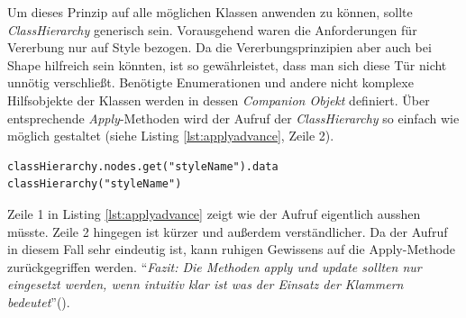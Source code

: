 Um dieses Prinzip auf alle möglichen Klassen anwenden zu können, sollte \textit{ClassHierarchy} generisch sein. Vorausgehend waren die Anforderungen für Vererbung nur auf Style bezogen. Da die Vererbungsprinzipien aber auch bei Shape hilfreich sein könnten, ist so gewährleistet, dass man sich diese Tür nicht unnötig verschließt. 
Benötigte Enumerationen und andere nicht komplexe Hilfsobjekte der Klassen werden in dessen \textit{Companion Objekt} definiert. 
Über entsprechende \textit{Apply}-Methoden wird der Aufruf der \textit{ClassHierarchy} so einfach wie möglich gestaltet (siehe Listing \ref{lst:applyadvance}, Zeile 2).
\begin{lstlisting}[style=scala, caption = {Beispielhafte Vereinfachung durch Apply Methode}, label = {lst:applyadvance}]
classHierarchy.nodes.get("styleName").data
classHierarchy("styleName")
\end{lstlisting}Zeile 1 in Listing \ref{lst:applyadvance} zeigt wie der Aufruf eigentlich ausshen müsste. Zeile 2 hingegen ist kürzer und außerdem verständlicher.
Da der Aufruf in diesem Fall sehr eindeutig ist, kann ruhigen Gewissens auf die Apply-Methode zurückgegriffen werden. "`\textit{Fazit: Die Methoden apply und update sollten nur eingesetzt werden, wenn intuitiv klar ist was der Einsatz der Klammern bedeutet}"'().

